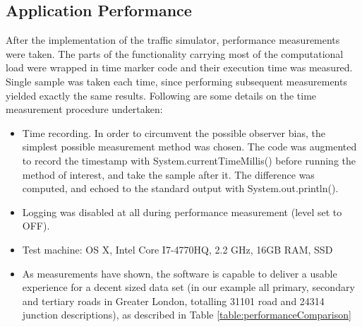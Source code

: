 \subsection{Application Performance}
After the implementation of the traffic simulator, performance measurements were taken. The parts of the functionality carrying most of the computational load were wrapped in time marker code and their execution time was measured. Single sample was taken each time, since performing subsequent measurements yielded exactly the same results. Following are some details on the time measurement procedure undertaken:

\begin{itemize}
    \item Time recording. In order to circumvent the possible observer bias, the simplest possible measurement method was chosen. The code was augmented to record the timestamp with System.currentTimeMillis() before running the method of interest, and take the sample after it. The difference was computed, and echoed to the standard output with System.out.println().
    \item Logging was disabled at all during performance measurement (level set to OFF).
    \item Test machine: OS X, Intel Core I7-4770HQ, 2.2 GHz, 16GB RAM, SSD
    \item As measurements have shown, the software is capable to deliver a usable experience for a decent sized data set (in our example all primary, secondary and tertiary roads in Greater London, totalling 31101 road and 24314 junction descriptions), as described in Table \ref{table:performanceComparison}
\end{itemize}

